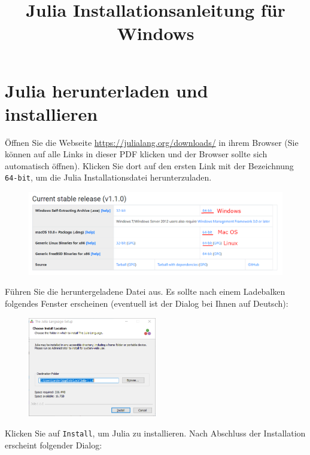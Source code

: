 \documentclass[11pt, a4paper]{scrartcl}
\title{Julia Installationsanleitung für Windows}
\author{}
\date{}
\begin{document}
	\maketitle
	
	\section{Julia herunterladen und installieren}
	Öffnen Sie die Webseite \url{https://julialang.org/downloads/} in ihrem Browser (Sie können auf alle Links in dieser PDF klicken und der Browser sollte sich automatisch öffnen). Klicken Sie dort auf den ersten Link mit der Bezeichnung \texttt{64-bit}, um die Julia Installationsdatei herunterzuladen.
	
	\begin{figure}[h!]
		\centering
		\includegraphics[width=\textwidth]{imgs/download.png}
	\end{figure}

	Führen Sie die heruntergeladene Datei aus. Es sollte nach einem Ladebalken folgendes Fenster erscheinen (eventuell ist der Dialog bei Ihnen auf Deutsch):
	
	\begin{figure}[h!]
		\centering
		\includegraphics[width=0.5\textwidth]{imgs/install.png}
	\end{figure}

	Klicken Sie auf \texttt{Install}, um Julia zu installieren. Nach Abschluss der Installation erscheint folgender Dialog: 
	
\end{document}
